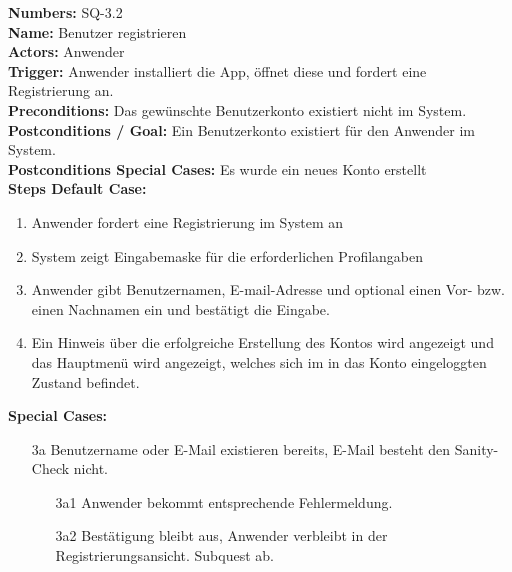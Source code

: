 \documentclass{article}
\begin{document}
\begin{samepage}
\textbf{Numbers:} SQ-3.2\\
\textbf{Name:} Benutzer registrieren\\
\textbf{Actors:} Anwender\\
\textbf{Trigger:} Anwender installiert die App, öffnet diese und fordert eine Registrierung an.\\
\textbf{Preconditions:} Das gewünschte Benutzerkonto existiert nicht im System. \\
\textbf{Postconditions / Goal:} Ein Benutzerkonto existiert für den Anwender im System.\\
\textbf{Postconditions Special Cases:} Es wurde ein neues Konto erstellt\\
\textbf{Steps Default Case:}
\begin{enumerate}
    \item Anwender fordert eine Registrierung im System an
    \item System zeigt Eingabemaske für die erforderlichen Profilangaben
    \item Anwender gibt Benutzernamen, E-mail-Adresse und optional einen Vor- bzw. einen Nachnamen ein und bestätigt die Eingabe.
    \item Ein Hinweis über die erfolgreiche Erstellung des Kontos wird angezeigt und das Hauptmenü wird angezeigt, welches sich im in das Konto eingeloggten Zustand befindet.
\end{enumerate}
\textbf{Special Cases:}
\begin{itemize}
\item [3a] Benutzername oder E-Mail existieren bereits, E-Mail besteht den Sanity-Check nicht.
\begin{itemize}
    \item [3a1] Anwender bekommt entsprechende Fehlermeldung.
    \item [3a2] Bestätigung bleibt aus, Anwender verbleibt in der Registrierungsansicht.
    Subquest ab.
\end{itemize}
\end{itemize}
\end{samepage}

\vspace{0.5cm}
\end{document}
